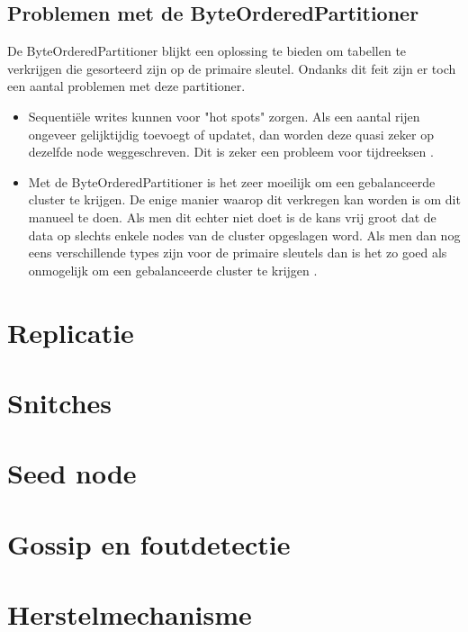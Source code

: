 \subsection{Problemen met de ByteOrderedPartitioner}
De ByteOrderedPartitioner blijkt een oplossing te bieden om tabellen te verkrijgen die gesorteerd zijn op de primaire sleutel.
Ondanks dit feit zijn er toch een aantal problemen met deze partitioner.

\begin{itemize}
	\item Sequentiële writes kunnen voor "hot spots" zorgen.
	Als een aantal rijen ongeveer gelijktijdig toevoegt of updatet, dan worden deze quasi zeker op dezelfde node weggeschreven.
	Dit is zeker een probleem voor tijdreeksen \citep{kan2014cassandra}.
	
	\item Met de ByteOrderedPartitioner is het zeer moeilijk om een gebalanceerde cluster te krijgen.
	De enige manier waarop dit verkregen kan worden is om dit manueel te doen.
	Als men dit echter niet doet is de kans vrij groot dat de data op slechts enkele nodes van de cluster opgeslagen word.
	Als men dan nog eens verschillende types zijn voor de primaire sleutels dan is het zo goed als onmogelijk om een gebalanceerde cluster te krijgen
	\citep{Bauer2013CaseAgainstByteOrder}.
\end{itemize}

\section{Replicatie}
\section{Snitches}
\section{Seed node}
\section{Gossip en foutdetectie}
\section{Herstelmechanisme}
